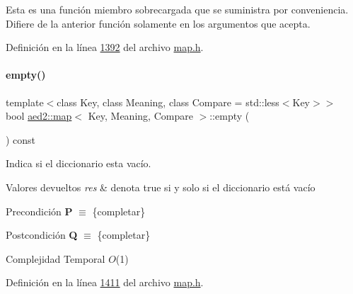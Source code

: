 Esta es una función miembro sobrecargada que se suministra por conveniencia. Difiere de la anterior función solamente en los argumentos que acepta. 

Definición en la línea \hyperlink{map_8h_source_l01392}{1392} del archivo \hyperlink{map_8h_source}{map.\+h}.

\mbox{\label{classaed2_1_1map_a0dcb39283f4877ae59cb756ed1d0c048_a0dcb39283f4877ae59cb756ed1d0c048}} 
\paragraph{\texorpdfstring{empty()}{empty()}}
{\footnotesize\ttfamily template$<$class Key, class Meaning, class Compare = std\+::less$<$\+Key$>$$>$ \\
bool \hyperlink{classaed2_1_1map}{aed2\+::map}$<$ Key, Meaning, Compare $>$\+::empty (\begin{DoxyParamCaption}{ }\end{DoxyParamCaption}) const\hspace{0.3cm}{\ttfamily [inline]}}



Indica si el diccionario esta vacío. 


\begin{DoxyRetVals}{Valores devueltos}
{\em res} & denota true si y solo si el diccionario está vacío\\
\hline
\end{DoxyRetVals}
\begin{DoxyPrecond}{Precondición}
{\bfseries P} $\equiv$ \{completar\} 
\end{DoxyPrecond}
\begin{DoxyPostcond}{Postcondición}
{\bfseries Q} $\equiv$ \{completar\}
\end{DoxyPostcond}

\begin{DoxyDescription}
\item[Complejidad Temporal]$O$(1)
\end{DoxyDescription}

Definición en la línea \hyperlink{map_8h_source_l01411}{1411} del archivo \hyperlink{map_8h_source}{map.\+h}.

\mbox{\label{classaed2_1_1map_aa6e806b3be6dc0da79adbfae08b571bf_aa6e806b3be6dc0da79adbfae08b571bf}} 
